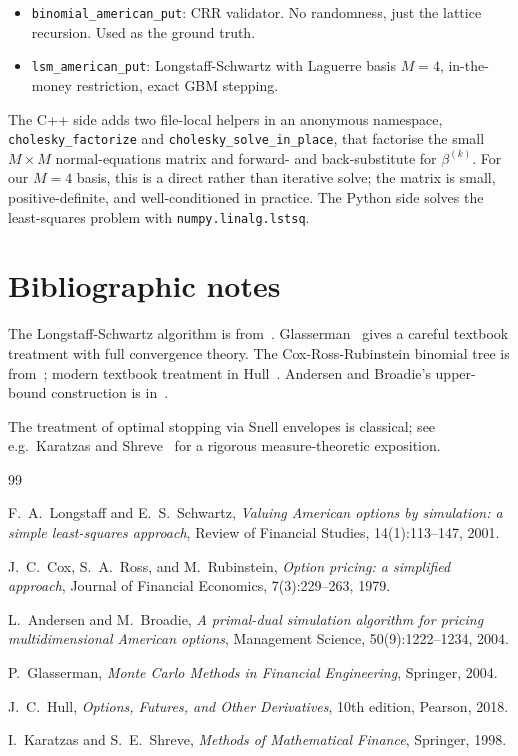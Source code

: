 \documentclass[11pt,a4paper]{article}
\theoremstyle{plain}
\theoremstyle{definition}
\theoremstyle{remark}
\begin{document}
\begin{itemize}
\item \texttt{binomial\_american\_put}: CRR validator. No randomness,
      just the lattice recursion. Used as the ground truth.
\item \texttt{lsm\_american\_put}: Longstaff-Schwartz with Laguerre
      basis $M = 4$, in-the-money restriction, exact GBM stepping.
\end{itemize}

The C++ side adds two file-local helpers in an anonymous namespace,
\texttt{cholesky\_factorize} and \texttt{cholesky\_solve\_in\_place},
that factorise the small $M \times M$ normal-equations matrix and
forward- and back-substitute for $\beta^{(k)}$. For our $M = 4$ basis,
this is a direct rather than iterative solve; the matrix is small,
positive-definite, and well-conditioned in practice. The Python side
solves the least-squares problem with \texttt{numpy.linalg.lstsq}.

\section{Bibliographic notes}
\label{sec:biblio}

The Longstaff-Schwartz algorithm is from~\cite{LongstaffSchwartz2001}.
Glasserman~\cite[Chapter 8]{Glasserman} gives a careful textbook
treatment with full convergence theory. The Cox-Ross-Rubinstein
binomial tree is from~\cite{CRR1979}; modern textbook treatment in
Hull~\cite[Chapter 21]{Hull}. Andersen and Broadie's upper-bound
construction is in~\cite{AndersenBroadie2004}.

The treatment of optimal stopping via Snell envelopes is classical;
see e.g.\ Karatzas and Shreve~\cite{KaratzasShreve} for a rigorous
measure-theoretic exposition.

\begin{thebibliography}{99}

F.\ A.\ Longstaff and E.\ S.\ Schwartz,
\emph{Valuing American options by simulation: a simple least-squares approach},
Review of Financial Studies, 14(1):113--147, 2001.

J.\ C.\ Cox, S.\ A.\ Ross, and M.\ Rubinstein,
\emph{Option pricing: a simplified approach},
Journal of Financial Economics, 7(3):229--263, 1979.

L.\ Andersen and M.\ Broadie,
\emph{A primal-dual simulation algorithm for pricing multidimensional American options},
Management Science, 50(9):1222--1234, 2004.

P.\ Glasserman,
\emph{Monte Carlo Methods in Financial Engineering},
Springer, 2004.

J.\ C.\ Hull,
\emph{Options, Futures, and Other Derivatives},
10th edition, Pearson, 2018.

I.\ Karatzas and S.\ E.\ Shreve,
\emph{Methods of Mathematical Finance},
Springer, 1998.

\end{thebibliography}
\end{document}
